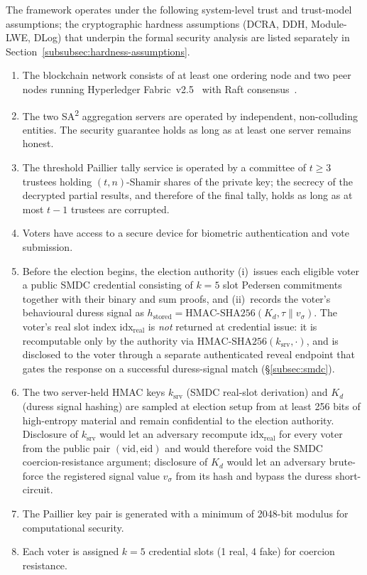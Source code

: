 The framework operates under the following system-level trust and trust-model assumptions; the cryptographic hardness assumptions (DCRA, DDH, Module-LWE, DLog) that underpin the formal security analysis are listed separately in Section~\ref{subsubsec:hardness-assumptions}.

\begin{enumerate}
    \item The blockchain network consists of at least one ordering node and two peer nodes running Hyperledger Fabric~v2.5~\cite{androulaki2018} with Raft consensus~\cite{ongaro2014raft}.
    \item The two SA\textsuperscript{2} aggregation servers are operated by independent, non-colluding entities. The security guarantee holds as long as at least one server remains honest.
    \item The threshold Paillier tally service is operated by a committee of $t \geq 3$ trustees holding $(t,n)$-Shamir shares of the private key; the secrecy of the decrypted partial results, and therefore of the final tally, holds as long as at most $t-1$ trustees are corrupted.
    \item Voters have access to a secure device for biometric authentication and vote submission.
    \item Before the election begins, the election authority (i)~issues each eligible voter a public SMDC credential consisting of $k=5$ slot Pedersen commitments together with their binary and sum proofs, and (ii)~records the voter's behavioural duress signal as $h_{\text{stored}} = \text{HMAC-SHA256}(K_d, \tau \| v_\sigma)$. The voter's real slot index $\text{idx}_{\text{real}}$ is \emph{not} returned at credential issue: it is recomputable only by the authority via $\text{HMAC-SHA256}(k_{\text{srv}}, \cdot)$, and is disclosed to the voter through a separate authenticated reveal endpoint that gates the response on a successful duress-signal match (\S\ref{subsec:smdc}).
    \item The two server-held HMAC keys $k_{\text{srv}}$ (SMDC real-slot derivation) and $K_d$ (duress signal hashing) are sampled at election setup from at least 256 bits of high-entropy material and remain confidential to the election authority. Disclosure of $k_{\text{srv}}$ would let an adversary recompute $\text{idx}_{\text{real}}$ for every voter from the public pair $(\text{vid}, \text{eid})$ and would therefore void the SMDC coercion-resistance argument; disclosure of $K_d$ would let an adversary brute-force the registered signal value $v_\sigma$ from its hash and bypass the duress short-circuit.
    \item The Paillier key pair is generated with a minimum of 2048-bit modulus for computational security.
    \item Each voter is assigned $k=5$ credential slots (1 real, 4 fake) for coercion resistance.
\end{enumerate}

